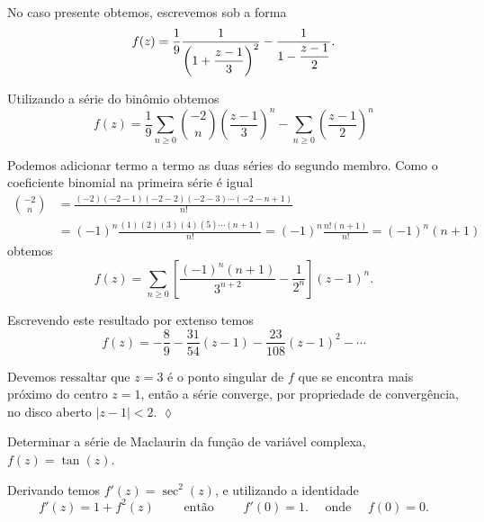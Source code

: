 No caso presente obtemos, escrevemos sob a forma
\begin{equation*}
f(z) = \frac{1}{9}\frac{1}{\displaystyle{\left(1 + \frac{z - 1}{3}\right)^2}}-
\frac{1}{\displaystyle{1 - \frac{z - 1}{2}}}.
\end{equation*}

Utilizando a s\'{e}rie do bin\^{o}mio obtemos
\begin{equation*}
f(z)=\frac{1}{9}\sum_{n\geq 0}{-2\choose n}
\left(\frac{z-1}{3}\right)^n - \sum_{n\geq 0}
\left(\frac{z-1}{2}\right)^n
\end{equation*}

Podemos adicionar termo a termo as duas s\'{e}ries do segundo membro.
Como o coeficiente binomial na primeira s\'{e}rie \'{e} igual
\begin{align*}
{-2\choose n}&=\frac{(-2)(-2-1)(-2-2)(-2-3)\cdots(-2-n+1)}{n!}\\[2ex]
&=(-1)^n\frac{(1)(2)(3)(4)(5)\cdots(n+1)}{n!}=(-1)^n\frac{n!(n+1)}{n!}=(- 1)^n(n + 1)
\end{align*}
obtemos
\begin{equation*}
f(z)=\sum_{n\geq
0}\left[\frac{(-1)^n(n+1)}{3^{n+2}}-\frac{1}{2^n}\right](z-1)^n.
\end{equation*}

Escrevendo este resultado por extenso temos
\begin{equation*}
  f(z)= -\frac{8}{9} - \frac{31}{54} (z -1) - \frac{23}{108} (z-
1)^2-\cdots
\end{equation*}

Devemos ressaltar que  $z = 3$ \'{e} o ponto singular de $f$ que se
encontra mais pr\'{o}ximo do centro $z=1$, ent\~{a}o a s\'{e}rie converge, por
propriedade de converg\^{e}ncia, no disco aberto $|z - 1|< 2$.\hfill
\(\lozenge\)


\begin{exer} Determinar a s\'{e}rie de
Maclaurin da fun\c{c}\~{a}o de vari\'{a}vel complexa, $f(z)=\tan(z)$.
\end{exer}

\solo Derivando temos $f'(z)= \sec^2(z)$, e utilizando a identidade
\begin{equation*}
f'(z) = 1 + f^2(z)\qquad\text{ ent\~{a}o }\qquad  f'(0) = 1.\quad \text{ onde }\quad  f(0)=0.
\end{equation*}

